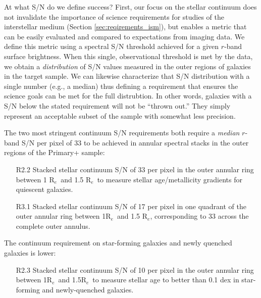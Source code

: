 \documentclass[preprint,11pt]{aastex}
\newcommand{\Hbeta}{{H$\beta$}}
\newcommand{\Reff}{{R$_{e}$}}
\begin{document}
At what S/N do we define success? First, our focus on the stellar continuum does not invalidate the importance of science requirements for studies of the
interstellar medium (Section \ref{sec:reqirements_ism}), but enables a metric that can be easily evaluated and compared to
expectations from imaging data.  We define this metric using a spectral S/N threshold achieved for a given $r$-band surface
brightness.  When this single, observational threshold is met by the data, we obtain a {\em distribution} of S/N values measured in
the outer regions of galaxies in the target sample.  We can likewise characterize that S/N distribution with a single number (e.g., a
median) thus defining a requirement that ensures the science goals can be met for the full distrubtion.  In other words, galaxies
with a S/N below the stated requirement will not be ``thrown out.''  They simply represent an acceptable subset of the sample with
somewhat less precision.  

The two most stringent continuum S/N requirements both require a {\em median} $r$-band S/N per pixel of 33 to be achieved in annular spectral stacks in the outer
regions of the Primary+ sample:

\begin{itemize}
\item [R2.2] Stacked stellar continuum S/N of 33 per pixel in the outer annular ring between 1 \Reff\ and 1.5 \Reff\ to measure stellar age/metallicity gradients for quiescent galaxies.
\item [R3.1] Stacked stellar continuum S/N of 17 per pixel in one quadrant of the outer annular ring between 1\Reff\ and 1.5 \Reff, corresponding to 33 across the complete outer annulus.
\end{itemize}

\noindent The continuum requirement on star-forming galaxies and newly quenched galaxies is lower: 
\begin{itemize}
\item[R2.3] Stacked stellar continuum S/N of 10 per pixel in the outer annular ring between 1\Reff\ and 1.5\Reff\ to measure stellar age to better than 0.1 dex in star-forming and newly-quenched galaxies. 
\end{itemize}

\end{document}
